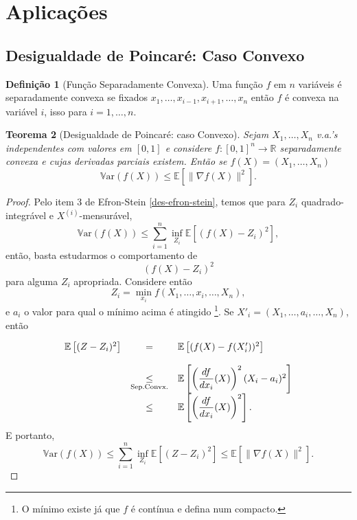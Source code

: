 \documentclass[12pt,a4paper,oneside]{book}
\newtheorem{theorem}{Teorema}[section]
\theoremstyle{definition}
\newtheorem{definition}[theorem]{Defini\c{c}\~ao}
\theoremstyle{remark}
\numberwithin{equation}{section}
\newcommand{\R}{\mathbb{R}}
\newcommand{\E}{\mathbb{E}}
\newcommand{\Var}{\mathbb{V}\text{ar}}
\begin{document}
\section{Aplicações}
\subsection{Desigualdade de Poincaré: Caso Convexo}

\begin{definition}[Função Separadamente Convexa] Uma função $f$ em $n$ variáveis é separadamente convexa se fixados $x_1,\dots,x_{i-1},x_{i+1},\dots,x_{n}$ então $f$ é convexa na variável $i$, isso para $i=1,\dots,n.$

\end{definition}

\begin{theorem}[Desigualdade de Poincaré: caso Convexo]\label{des-conv-poicare} Sejam $X_1,\dots,X_n$ v.a.'s independentes com valores em $[0,1]$ e considere $f:[0,1]^n\rightarrow \R$ separadamente convexa e cujas derivadas parciais existem. Então se $f(X) = (X_1,\dots,X_n)$
$$\Var(f(X)) \leq \E\left[ \|   \nabla f(X)  \|^2 \right]. $$
\end{theorem}

\begin{proof}
Pelo item 3 de Efron-Stein \ref{des-efron-stein}, temos que para $Z_i$ quadrado-integrável e $X^{(i)}$-mensurável,
$$\Var(f(X)) \leq  \sum_{i=1}^n \inf_{Z_i}  \E\left[(f(X)-Z_i)^2\right], $$
então, basta estudarmos o comportamento de 
$$(f(X)-Z_i)^2 $$
para alguma $Z_i$ apropriada. Considere então
$$Z_i = \min_{x_i}f(X_1,\dots,x_i,\dots,X_n),$$
e $a_i$ o valor para qual o mínimo acima é atingido \footnote{O mínimo existe já que $f$ é contínua e defina num compacto.}. Se $X'_i = (X_1,\dots,a_i,\dots, X_n)$, então

$$ 
\begin{array}{lcl}\bigskip
\E\left[(Z-Z_i)^2\right] &=& \E\left[(f(X)-f(X'_i))^2\right]\\
&\underset{\text{Sep.Convx.}}{\leq}& \E\left[\left(\dfrac{d f}{d x_i}(X) \right)^2(X_i-a_i)^2\right]\\
&\leq & \E\left[\left(\dfrac{d f}{d x_i}(X) \right)^2\right].
\end{array}
$$
E portanto,
$$\Var(f(X)) \leq  \sum_{i=1}^n \inf_{Z_i}  \E\left[(Z-Z_i)^2\right]\leq \E\left[ \|\nabla f(X)\|^2\right].$$
\end{proof}
\end{document}
